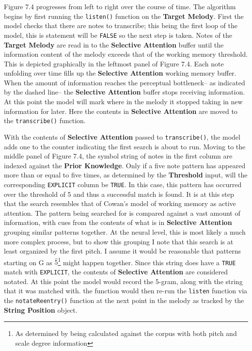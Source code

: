 \documentclass[]{book}
\let\rmarkdownfootnote\footnote%
\def\footnote{\protect\rmarkdownfootnote}
\begin{document}
Figure 7.4 progresses from left to right over the course of time.
The algorithm begins by first running the \texttt{listen()} function on the \textbf{Target Melody}.
First the model checks that there are notes to transcribe; this being the first loop of the model, this is statement will be \texttt{FALSE} so the next step is taken.
Notes of the \textbf{Target Melody} are read in to the \textbf{Selective Attention} buffer until the information content of the melody exceeds that of the working memory threshold.
This is depicted graphically in the leftmost panel of Figure 7.4.
Each note unfolding over time fills up the \textbf{Selective Attention} working memory buffer.
When the amount of information reaches the perceptual bottleneck-- as indicated by the dashed line-- the \textbf{Selective Attention} buffer stops receiving information.
At this point the model will mark where in the melody it stopped taking in new information for later.
Here the contents in \textbf{Selective Attention} are moved to the \texttt{transcribe()} function.

With the contents of \textbf{Selective Attention} passed to \texttt{transcribe()}, the model adds one to the counter indicating the first search is about to run.
Moving to the middle panel of Figure 7.4, the symbol string of notes in the first column are indexed against the \textbf{Prior Knowledge}.
Only if a five note pattern has appeared more than or equal to five times, as determined by the \textbf{Threshold} input, will the corresponding \texttt{EXPLICIT} column be \texttt{TRUE}.
In this case, this pattern has occurred over the threshold of 5 and thus a successful match is found.
It is at this step that the search resembles that of Cowan's model of working memory as active attention.
The pattern being searched for is compared against a vast amount of information, with cues from the contents of what is in \textbf{Selective Attention} grouping similar patterns together.
At the neural level, this is most likely a much more complex process, but to show this grouping I note that this search is at least organized by the first pitch.
I assume it would be reasonable that patterns starting on G as \(\hat{5}\)\footnote{As determined by being calculated against the corpus with both pitch and scale degree information} might happen together.
Since this string does have a \texttt{TRUE} match with \texttt{EXPLICIT}, the contents of \textbf{Selective Attention} are considered notated.
At this point the model would record the 5-gram, along with the string that it was matched with.
the function would then re-run the \texttt{listen} function via the \texttt{notateReentry()} function at the next point in the melody as tracked by the \textbf{String Position} object.
\end{document}
